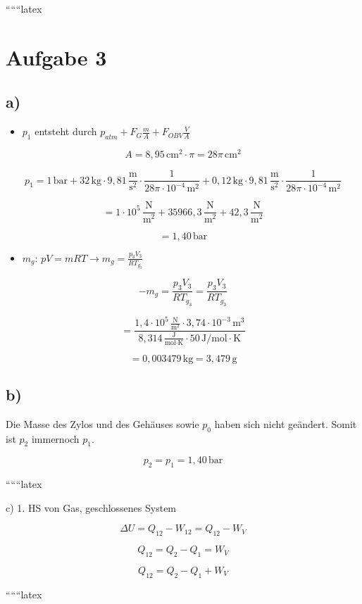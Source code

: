
``````latex


\section*{Aufgabe 3}

\subsection*{a)}

\begin{itemize}
    \item $p_1$ entsteht durch $p_{atm} + F_G \frac{m}{A} + F_{OBV} \frac{V}{A}$
\end{itemize}

\[
A = 8,95 \, \text{cm}^2 \cdot \pi = 28 \pi \, \text{cm}^2
\]

\[
p_1 = 1 \, \text{bar} + 32 \, \text{kg} \cdot 9,81 \, \frac{\text{m}}{\text{s}^2} \cdot \frac{1}{28 \pi \cdot 10^{-4} \, \text{m}^2} + 0,12 \, \text{kg} \cdot 9,81 \, \frac{\text{m}}{\text{s}^2} \cdot \frac{1}{28 \pi \cdot 10^{-4} \, \text{m}^2}
\]

\[
= 1 \cdot 10^5 \, \frac{\text{N}}{\text{m}^2} + 35966,3 \, \frac{\text{N}}{\text{m}^2} + 42,3 \, \frac{\text{N}}{\text{m}^2}
\]

\[
= 1,40 \, \text{bar}
\]

\begin{itemize}
    \item $m_g$: $pV = mRT \rightarrow m_g = \frac{p_3 V_3}{R T_{g_3}}$
\end{itemize}

\[
-m_g = \frac{p_3 V_3}{R T_{g_3}} = \frac{p_3 V_3}{R T_{g_3}}
\]

\[
= \frac{1,4 \cdot 10^5 \, \frac{\text{N}}{\text{m}^2} \cdot 3,74 \cdot 10^{-3} \, \text{m}^3}{8,314 \, \frac{\text{J}}{\text{mol} \cdot \text{K}} \cdot 50 \, \text{J} / \text{mol} \cdot \text{K}}
\]

\[
= 0,003479 \, \text{kg} = 3,479 \, \text{g}
\]

\subsection*{b)}

Die Masse des Zylos und des Gehäuses sowie $p_0$ haben sich nicht geändert. Somit ist $p_2$ immernoch $p_1$.

\[
p_2 = p_1 = 1,40 \, \text{bar}
\]

``````latex


c) 1. HS von Gas, geschlossenes System

\[
\Delta U = Q_{12} - W_{12} = Q_{12} - W_V
\]

\[
Q_{12} = Q_2 - Q_1 = W_V
\]

\[
Q_{12} = Q_2 - Q_1 + W_V
\]

``````latex


